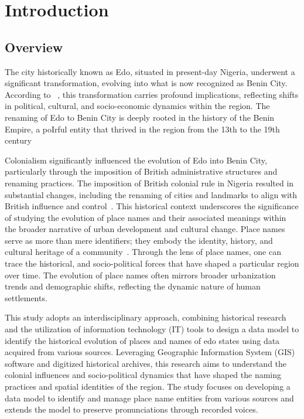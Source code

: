 \chapter{Introduction}
\section{Overview}
The city historically known as Edo, situated in present-day Nigeria, underwent a significant transformation, evolving into what is now recognized as Benin City. According to ~\cite{Michael2023}, this transformation carries profound implications, reflecting shifts in political, cultural, and socio-economic dynamics within the region. The renaming of Edo to Benin City is deeply rooted in the history of the Benin Empire, a poIrful entity that thrived in the region from the 13th to the 19th century~\cite{egharevba1968short} 

Colonialism significantly influenced the evolution of Edo into Benin City, particularly through the imposition of British administrative structures and renaming practices. The imposition of British colonial rule in Nigeria resulted in substantial changes, including the renaming of cities and landmarks to align with British influence and control~\cite{falola2008history}. This historical context underscores the significance of studying the evolution of place names and their associated meanings within the broader narrative of urban development and cultural change.
Place names serve as more than mere identifiers; they embody the identity, history, and cultural heritage of a community~\cite{Gelling}. Through the lens of place names, one can trace the historical, and socio-political forces that have shaped a particular region over time. The evolution of place names often mirrors broader urbanization trends and demographic shifts, reflecting the dynamic nature of human settlements.

This study adopts an interdisciplinary approach, combining historical research and the utilization of information technology (IT) tools to design a data model to identify the historical evolution of places and names of edo states using data acquired from various sources. Leveraging Geographic Information System (GIS) software and digitized historical archives, this research aims to understand the colonial influences and socio-political dynamics that have shaped the naming practices and spatial identities of the region. The study focuses on developing a data model to identify and manage place name entities from various sources and extends the model to preserve pronunciations through recorded voices.

